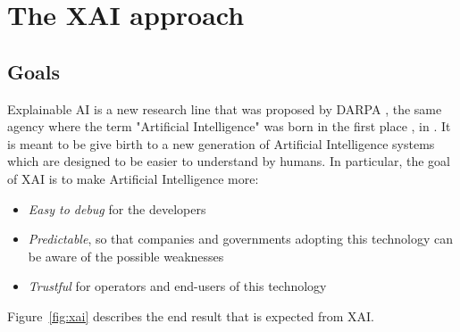 \documentclass[conference]{IEEEtran}
\newcommand{\cit}[1][]{\todo[tickmarkheight=0.2cm]{cit #1}}
\begin{document}



\section{The XAI approach}
\label{sec:xai}

\subsection{Goals}

Explainable AI is a new research line that was proposed by
DARPA \cit, the same agency where the term "Artificial Intelligence" was born in
the first place \cit, in . It
is meant to be give birth to a new generation of Artificial Intelligence systems which are
designed to be easier to understand by humans. In particular, the goal of XAI is
to make Artificial Intelligence more:

\begin{itemize}
    \item \textit{Easy to debug }for the developers
    \item \textit{Predictable}, so that companies and governments adopting this
          technology can be aware of the possible weaknesses
    \item \textit{Trustful} for operators and end-users of this technology
\end{itemize}

Figure~\ref{fig:xai} describes the end result that is expected from XAI.
\end{document}
